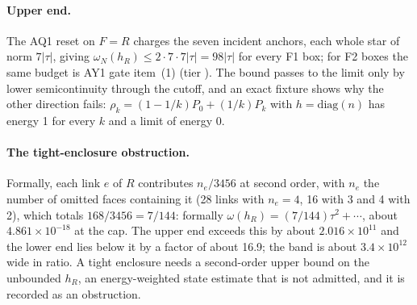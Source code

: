 \paragraph{Upper end.} The AQ1 reset on $F=R$ charges the seven incident
anchors, each whole star of norm $7|\tau|$, giving
$\omega_N(h_R)\le2\cdot7\cdot7|\tau|=98|\tau|$ for every F1 box; for F2 boxes the
same budget is AY1 gate item~(1) (tier ). The bound passes
to the limit only by lower semicontinuity through the cutoff, and an exact
fixture shows why the other direction fails: $\rho_k=(1-1/k)P_0+(1/k)P_k$ with
$h=\mathrm{diag}(n)$ has energy 1 for every $k$ and a limit of energy 0.

\paragraph{The tight-enclosure obstruction.} Formally, each link $e$ of $R$
contributes $n_e/3456$ at second order, with $n_e$ the number of omitted faces
containing it (28 links with $n_e=4$, 16 with 3 and 4 with 2), which totals
$168/3456=7/144$: formally $\omega(h_R)=(7/144)\tau^2+\cdots$, about
$4.861\times10^{-18}$ at the cap. The upper end exceeds this by about
$2.016\times10^{11}$ and the lower end lies below it by a factor of about
16.9; the band is about $3.4\times10^{12}$ wide in ratio. A tight enclosure
needs a second-order upper bound on the unbounded $h_R$, an energy-weighted
state estimate that is not admitted, and it is recorded as an obstruction.

